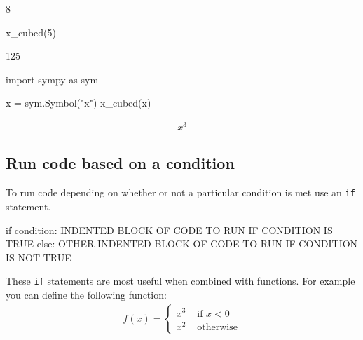 \begin{raw}
8
\end{raw}







\begin{pyin}
x_cubed(5)
\end{pyin}





\begin{raw}
125
\end{raw}







\begin{pyin}
import sympy as sym

x = sym.Symbol("x")
x_cubed(x)
\end{pyin}




\begin{equation*}
\begin{split}\displaystyle x^{3}\end{split}
\end{equation*}




\subsection{Run code based on a condition}
\label{\detokenize{tools-for-mathematics/06-probability/how/main:conditional-running-of-code}}

To run code depending on whether or not a particular condition is met use
an \texttt{if} statement.


\begin{pyin}
if condition:
    INDENTED BLOCK OF CODE TO RUN IF CONDITION IS TRUE
else:
    OTHER INDENTED BLOCK OF CODE TO RUN IF CONDITION IS NOT TRUE
\end{pyin}



These \texttt{if} statements are most useful when combined with functions. For example
you can define the following function:
\begin{equation*}
\begin{split}
    f(x) = \begin{cases}
            x ^ 3&\text{ if }x < 0\\
            x ^ 2&\text{ otherwise}
            \end{cases}
\end{split}
\end{equation*}



